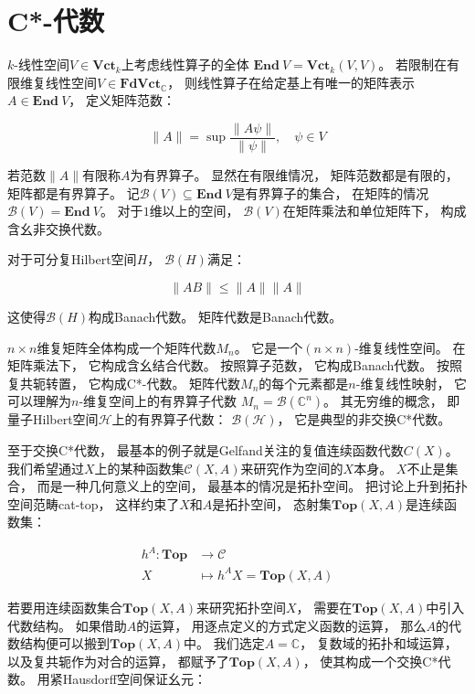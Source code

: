 \documentclass[10pt, openany]{book}
\begin{document}
\section{C*-代数}

$k$-线性空间$V\in\textbf{Vct}_k$上考虑线性算子的全体
$\textbf{End} \ V = \textbf{Vct}_k(V,V)$。
若限制在有限维复线性空间$V \in \textbf{FdVct}_\mathbb C$，
则线性算子在给定基上有唯一的矩阵表示$A\in\textbf{End} \ V$，
定义矩阵范数：

$$
\| A \| = \sup \frac{\| A\psi \|}{\| \psi \|},\quad 
\psi \in V
$$

若范数$\| A \|$有限称$A$为有界算子。
显然在有限维情况，
矩阵范数都是有限的，
矩阵都是有界算子。
记$\mathcal B(V) \subseteq \textbf{End} \ V$是有界算子的集合，
在矩阵的情况$\mathcal B(V) = \textbf{End} \ V$。
对于$1$维以上的空间，
$\mathcal B(V)$在矩阵乘法和单位矩阵下，
构成含幺非交换代数。

对于可分复Hilbert空间$H$，
$\mathcal B(H)$满足：

$$
\| A B \| \leq \| A \| \| A \|
$$

这使得$\mathcal B(H)$构成Banach代数。
矩阵代数是Banach代数。

$n \times n$维复矩阵全体构成一个矩阵代数$M_n$。
它是一个$(n \times n)$-维复线性空间。
在矩阵乘法下，
它构成含幺结合代数。
按照算子范数，
它构成Banach代数。
按照复共轭转置，
它构成C*-代数。
矩阵代数$M_n$的每个元素都是$n$-维复线性映射，
它可以理解为$n$-维复空间上的有界算子代数
$M_n = \mathcal B(\mathbb C^n)$。
其无穷维的概念，
即量子Hilbert空间$\mathscr H$上的有界算子代数：
$\mathcal B(\mathscr H)$，
它是典型的非交换C*代数。

至于交换C*代数，
最基本的例子就是Gelfand关注的复值连续函数代数$C(X)$。
我们希望通过$X$上的某种函数集$\mathcal C(X,A)$来研究作为空间的$X$本身。
$X$不止是集合，
而是一种几何意义上的空间，
最基本的情况是拓扑空间。
把讨论上升到拓扑空间范畴\gls{cat-top}，
这样约束了$X$和$A$是拓扑空间，
态射集$\textbf{Top}(X,A)$是连续函数集：

$$
\begin{aligned}
  h^A: \textbf{Top} &\to \mathcal C \\
  X &\mapsto h^A X = \textbf{Top}(X,A)
\end{aligned}
$$

若要用连续函数集合$\textbf{Top}(X,A)$来研究拓扑空间$X$，
需要在$\textbf{Top}(X,A)$中引入代数结构。
如果借助$A$的运算，
用逐点定义的方式定义函数的运算，
那么$A$的代数结构便可以搬到$\textbf{Top}(X,A)$中。
我们选定$A = \mathbb C$，
复数域的拓扑和域运算，
以及复共轭作为对合的运算，
都赋予了$\textbf{Top}(X,A)$，
使其构成一个交换C*代数。
用紧Hausdorff空间保证幺元：
\end{document}
